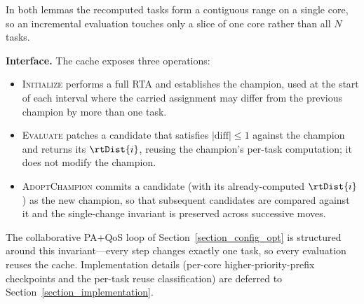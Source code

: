     In both lemmas the recomputed tasks form a contiguous range on a single core, so an incremental evaluation touches only a slice of one core rather than all $N$ tasks.

    \textbf{Interface.}
    The cache exposes three operations:
    \begin{itemize}
        \item \textsc{Initialize} performs a full RTA and establishes the champion, used at the start of each interval where the carried assignment may differ from the previous champion by more than one task.
        \item \textsc{Evaluate} patches a candidate that satisfies $|\mathrm{diff}| \leq 1$ against the champion and returns its $\rtDist{i}$, reusing the champion's per-task computation; it does not modify the champion.
        \item \textsc{AdoptChampion} commits a candidate (with its already-computed $\rtDist{i}$) as the new champion, so that subsequent candidates are compared against it and the single-change invariant is preserved across successive moves.
    \end{itemize}

    The collaborative PA+QoS loop of Section~\ref{section_config_opt} is structured around this invariant---every step changes exactly one task, so every evaluation reuses the cache.
    Implementation details (per-core higher-priority-prefix checkpoints and the per-task reuse classification) are deferred to Section~\ref{section_implementation}.
